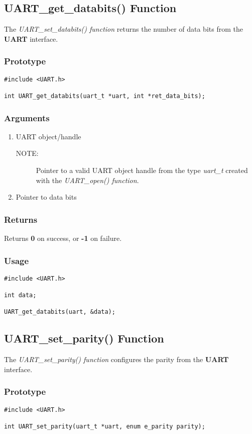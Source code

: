 \documentclass{report}
\begin{document}
\subsection{UART\_get\_databits() Function}
The \textit{UART\_set\_databits() function} returns the number
of data bits from the \textbf{UART} interface.
\subsubsection*{Prototype}
\begin{lstlisting}
#include <UART.h>

int UART_get_databits(uart_t *uart, int *ret_data_bits);
\end{lstlisting}
\subsubsection*{Arguments}
\begin{enumerate}
\item UART object/handle
\begin{description}
\item[NOTE:] Pointer to a valid UART object handle from the type \textit{uart\_t}
created with the \textit{UART\_open() function}.
\end{description}
\item Pointer to data bits
\end{enumerate}
\subsubsection*{Returns}
Returns \textbf{0} on success, or \textbf{-1} on failure.
\subsubsection*{Usage}
\begin{lstlisting}
#include <UART.h>

int data;

UART_get_databits(uart, &data);
\end{lstlisting}
\subsection{UART\_set\_parity() Function}
The \textit{UART\_set\_parity() function} configures the parity
from the \textbf{UART} interface.
\subsubsection*{Prototype}
\begin{lstlisting}
#include <UART.h>

int UART_set_parity(uart_t *uart, enum e_parity parity);
\end{lstlisting}
\end{document}

